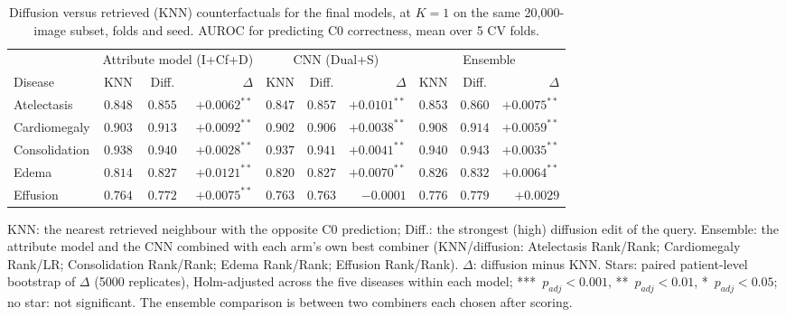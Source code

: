 \begin{table}[htbp]
\centering
\small
\caption{Diffusion versus retrieved (KNN) counterfactuals for the final models, at $K=1$ on the same 20{,}000-image subset, folds and seed. AUROC for predicting C0 correctness, mean over 5 CV folds.}
\label{tab:diffusion_vs_knn}
\begin{threeparttable}
\begin{tabular}{lccr|ccr|ccr}
\toprule
 & \multicolumn{3}{c|}{Attribute model (I+Cf+D)} & \multicolumn{3}{c|}{CNN (Dual+S)} & \multicolumn{3}{c}{Ensemble} \\
\cmidrule(lr){2-4} \cmidrule(lr){5-7} \cmidrule(l){8-10}
Disease & KNN & Diff. & $\Delta$ & KNN & Diff. & $\Delta$ & KNN & Diff. & $\Delta$ \\
\midrule
Atelectasis & $0.848$ & $0.855$ & $+0.0062^{**}$ & $0.847$ & $0.857$ & $+0.0101^{**}$ & $0.853$ & $0.860$ & $+0.0075^{**}$ \\
Cardiomegaly & $0.903$ & $0.913$ & $+0.0092^{**}$ & $0.902$ & $0.906$ & $+0.0038^{**}$ & $0.908$ & $0.914$ & $+0.0059^{**}$ \\
Consolidation & $0.938$ & $0.940$ & $+0.0028^{**}$ & $0.937$ & $0.941$ & $+0.0041^{**}$ & $0.940$ & $0.943$ & $+0.0035^{**}$ \\
Edema & $0.814$ & $0.827$ & $+0.0121^{**}$ & $0.820$ & $0.827$ & $+0.0070^{**}$ & $0.826$ & $0.832$ & $+0.0064^{**}$ \\
Effusion & $0.764$ & $0.772$ & $+0.0075^{**}$ & $0.763$ & $0.763$ & $-0.0001$ & $0.776$ & $0.779$ & $+0.0029$ \\
\bottomrule
\end{tabular}
\begin{tablenotes}\footnotesize
\item KNN: the nearest retrieved neighbour with the opposite C0 prediction; Diff.: the strongest (high) diffusion edit of the query. Ensemble: the attribute model and the CNN combined with each arm's own best combiner (KNN/diffusion: Atelectasis Rank/Rank; Cardiomegaly Rank/LR; Consolidation Rank/Rank; Edema Rank/Rank; Effusion Rank/Rank). $\Delta$: diffusion minus KNN. Stars: paired patient-level bootstrap of $\Delta$ (5000 replicates), Holm-adjusted across the five diseases within each model; ***~$p_{adj} < 0.001$, **~$p_{adj} < 0.01$, *~$p_{adj} < 0.05$; no star: not significant. The ensemble comparison is between two combiners each chosen after scoring.
\end{tablenotes}
\end{threeparttable}
\end{table}
